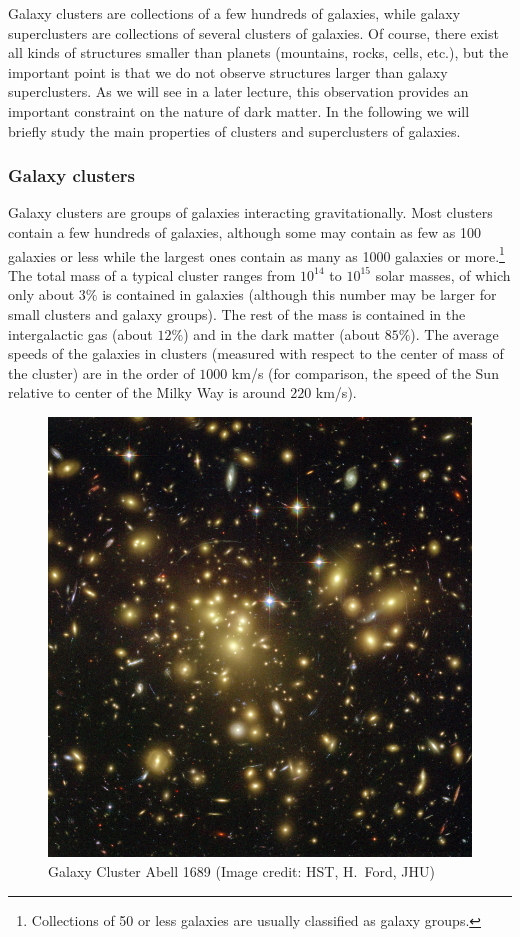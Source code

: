 \documentclass[11pt, a4paper,oneside,openright]{book}
\numberwithin{equation}{section}
\begin{document}
Galaxy clusters are collections of a few hundreds of galaxies, while galaxy superclusters are collections of several clusters of galaxies. Of course, there exist all kinds of structures smaller than planets (mountains, rocks, cells, etc.), but the important point is that we do not observe structures larger than galaxy superclusters. As we will see in a later lecture, this observation provides an important constraint on the nature of dark matter. In the following we will briefly study the main properties of clusters and superclusters of galaxies.

\subsubsection{Galaxy clusters}

Galaxy clusters are groups of galaxies interacting gravitationally. Most clusters contain a few hundreds of galaxies, although some may contain as few as 100 galaxies or less while the largest ones contain as many as 1000 galaxies or more.\footnote{Collections of 50 or less galaxies are usually classified as galaxy groups.} The total mass of a typical cluster ranges from $10^{14}$ to $10^{15}$ solar masses, of which only about $3\%$ is contained in galaxies (although this number may be larger for small clusters and galaxy groups). The rest of the mass is contained in the intergalactic gas (about $12\%$) and in the dark matter (about $85\%$). The average speeds of the galaxies in clusters (measured with respect to the center of mass of the cluster) are in the order of $1000$ km/s (for comparison, the speed of the Sun relative to center of the Milky Way is around $220$ km/s).
\begin{figure}[ht]
\begin{center}
\includegraphics[scale=1.2]{Draw/lec8_1.png}
\end{center}
\caption{Galaxy Cluster Abell 1689 (Image credit: HST, H.\ Ford, JHU)}
\label{fig:lec8_1}
\end{figure}
\end{document}
